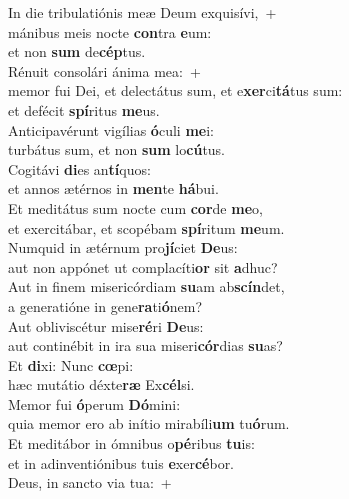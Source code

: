 \evenverse In die tribulatiónis meæ Deum exquisívi,~+\\\evenverse  mánibus meis nocte \textbf{con}tra \textbf{e}um:~\*\\
\evenverse et non \textbf{sum} de\textbf{cép}tus.\\
\oddverse Rénuit consolári ánima mea:~+\\
\oddverse  memor fui Dei, et delectátus sum, et e\textbf{xer}ci\textbf{tá}tus sum:~\*\\
\oddverse et defécit \textbf{spí}ritus \textbf{me}us.\\
\evenverse Anticipavérunt vigílias \textbf{ó}culi \textbf{me}i:~\*\\
\evenverse turbátus sum, et non \textbf{sum} lo\textbf{cú}tus.\\
\oddverse Cogitávi \textbf{di}es an\textbf{tí}quos:~\*\\
\oddverse et annos ætérnos in \textbf{men}te \textbf{há}bui.\\
\evenverse Et meditátus sum nocte cum \textbf{cor}de \textbf{me}o,~\*\\
\evenverse et exercitábar, et scopébam \textbf{spí}ritum \textbf{me}um.\\
\oddverse Numquid in ætérnum pro\textbf{jí}ciet \textbf{De}us:~\*\\
\oddverse aut non appónet ut complacíti\textbf{or} sit \textbf{a}dhuc?\\
\evenverse Aut in finem misericórdiam \textbf{su}am ab\textbf{scín}det,~\*\\
\evenverse a generatióne in gene\textbf{ra}ti\textbf{ó}nem?\\
\oddverse Aut obliviscétur mise\textbf{ré}ri \textbf{De}us:~\*\\
\oddverse aut continébit in ira sua miseri\textbf{cór}dias \textbf{su}as?\\
\evenverse Et \textbf{di}xi: Nunc \textbf{cœ}pi:~\*\\
\evenverse hæc mutátio déxte\textbf{ræ} Ex\textbf{cél}si.\\
\oddverse Memor fui \textbf{ó}perum \textbf{Dó}mini:~\*\\
\oddverse quia memor ero ab inítio mirabíli\textbf{um} tu\textbf{ó}rum.\\
\evenverse Et meditábor in ómnibus o\textbf{pé}ribus \textbf{tu}is:~\*\\
\evenverse et in adinventiónibus tuis \textbf{e}xer\textbf{cé}bor.\\
\oddverse Deus, in sancto via tua:~+\\
